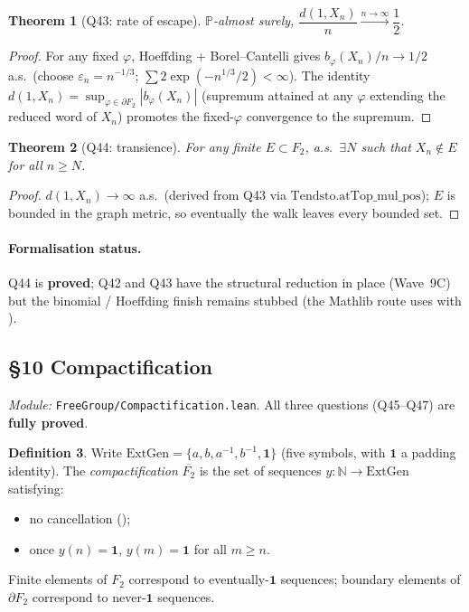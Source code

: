 \documentclass[11pt,a4paper]{article}
\newcommand{\done}[1]{\textcolor{donegreen}{\textbf{#1}}}
\newcommand{\lmod}[1]{\texttt{\small #1}}
\newcommand{\N}{\mathbb{N}}
\newcommand{\BFG}{\partial F_2}
\newcommand{\cpt}{\overline{F_2}}
\newcommand{\busem}{b}
\theoremstyle{plain}
\newtheorem{theorem}{Theorem}[section]
\theoremstyle{definition}
\newtheorem{definition}[theorem]{Definition}
\begin{document}
\begin{theorem}[Q43: rate of escape]
$\mathbb P$-almost surely,
$\dfrac{d(1, X_n)}{n} \xrightarrow{n\to\infty} \dfrac12$.
\end{theorem}

\begin{proof}
For any fixed $\varphi$, Hoeffding + Borel--Cantelli gives
$\busem_\varphi(X_n)/n \to 1/2$ a.s.\ (choose $\varepsilon_n = n^{-1/3}$;
$\sum 2\exp(-n^{1/3}/2) < \infty$). The identity
$d(1, X_n) = \sup_{\varphi \in \BFG} |\busem_\varphi(X_n)|$
(supremum attained at any $\varphi$ extending the reduced word of $X_n$)
promotes the fixed-$\varphi$ convergence to the supremum.
\end{proof}

\begin{theorem}[Q44: transience]
For any finite $E \subset F_2$, a.s.\ $\exists N$ such that
$X_n \notin E$ for all $n \geq N$.
\end{theorem}

\begin{proof}
$d(1, X_n) \to \infty$ a.s.\ (derived from Q43 via
$\text{Tendsto.atTop\_mul\_pos}$); $E$ is bounded in the graph metric,
so eventually the walk leaves every bounded set.
\end{proof}

\paragraph{Formalisation status.} Q44 is \done{proved}; Q42 and Q43 have
the structural reduction  in place
(Wave~9C) but the binomial / Hoeffding finish remains stubbed (the
Mathlib route uses
 with
).

\subsection{\S10 Compactification}
\emph{Module:} \lmod{FreeGroup/Compactification.lean}. All three
questions (Q45--Q47) are \done{fully proved}.

\begin{definition}
Write $\text{ExtGen} = \{a, b, a^{-1}, b^{-1}, \mathbf 1\}$
(five symbols, with $\mathbf 1$ a padding identity). The
\emph{compactification} $\cpt$ is the set of sequences
$y : \N \to \text{ExtGen}$ satisfying:
\begin{itemize}[leftmargin=2em]
\item no cancellation ();
\item once $y(n) = \mathbf 1$, $y(m) = \mathbf 1$ for all $m \geq n$.
\end{itemize}
Finite elements of $F_2$ correspond to eventually-$\mathbf 1$ sequences;
boundary elements of $\BFG$ correspond to never-$\mathbf 1$ sequences.
\end{definition}
\end{document}
